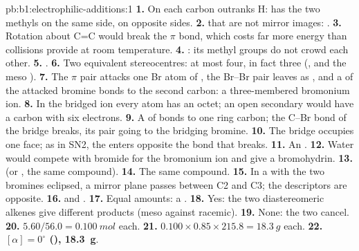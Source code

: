 \begin{solution}{pb:b1:electrophilic-additions:1}
\textbf{1.} On each carbon  outranks H:  has the two methyls on
the same side,  on opposite sides.
\textbf{2.}  that are not mirror images: .
\textbf{3.} Rotation about C=C would break the $\pi$ bond, which costs far
more energy than collisions provide at room temperature.
\textbf{4.} : its methyl groups do not crowd each other.
\textbf{5.} .
\textbf{6.} Two equivalent stereocentres: at most four, in fact three
(,  and the meso ).
\textbf{7.} The $\pi$ pair attacks one Br atom of , the Br--Br pair
leaves as , and a  of the attacked bromine bonds to the
second carbon: a three-membered bromonium ion.
\textbf{8.} In the bridged ion every atom has an octet; an open secondary
 would have a carbon with six electrons.
\textbf{9.} A  of  bonds to one ring carbon; the C--Br bond
of the bridge breaks, its pair going to the bridging bromine.
\textbf{10.} The bridge occupies one face; as in SN2, the  enters
opposite the bond that breaks.
\textbf{11.} An .
\textbf{12.} Water would compete with bromide for the bromonium ion and give
a bromohydrin.
\textbf{13.}  (or , the same compound).
\textbf{14.} The same compound.
\textbf{15.} In a  with the two bromines eclipsed, a mirror plane
passes between C2 and C3; the descriptors are opposite.
\textbf{16.}  and .
\textbf{17.} Equal amounts: a .
\textbf{18.} Yes: the two diastereomeric alkenes give different products
(meso against racemic).
\textbf{19.} None: the two  cancel.
\textbf{20.} $5.60/56.0 = \qty{0.100}{mol}$ each.
\textbf{21.} $0.100 \times 0.85 \times 215.8 = \qty{18.3}{g}$ each.
\textbf{22.} \textbf{$[\alpha] = 0^\circ$ (), \qty{18.3}{g}}.
\end{solution}
